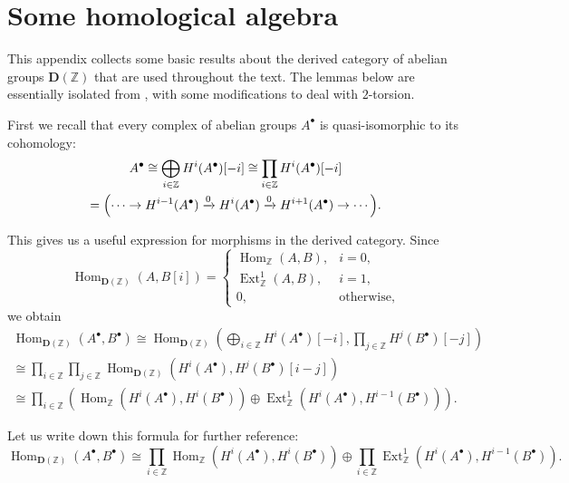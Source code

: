 \documentclass[draft,leqno,12pt]{article}
\theoremstyle{plain}
\theoremstyle{definition}
\DeclareMathOperator{\Hom}{Hom}
\DeclareMathOperator{\Ext}{Ext}
\newcommand{\ZZ}{\mathbb{Z}}
\begin{document}

\pagebreak
\appendix
\section{Some homological algebra}
\label{app:homological-algebra}

This appendix collects some basic results about the derived category of abelian
groups $\mathbf{D} (\ZZ)$ that are used throughout the text. The lemmas below
are essentially isolated from \cite{Flach-Morin-2018}, with some modifications
to deal with $2$-torsion.

First we recall that every complex of abelian groups $A^\bullet$ is
quasi-isomorphic to its cohomology:
\begin{multline*}
  A^\bullet \cong \bigoplus_{i\in \ZZ} H^i (A^\bullet) [-i] \cong
  \prod_{i\in \ZZ} H^i (A^\bullet) [-i] \\
  = \Bigl(\cdots \to H^{i-1} (A^\bullet) \xrightarrow{0} H^i (A^\bullet)
  \xrightarrow{0} H^{i+1} (A^\bullet) \to \cdots\Bigr).
\end{multline*}

This gives us a useful expression for morphisms in the derived category.
Since
\[ \Hom_{\mathbf{D} (\ZZ)} (A,B [i]) = \begin{cases}
\Hom_\ZZ (A,B), & i = 0,\\
\Ext_\ZZ^1 (A,B), & i = 1,\\
0, & \text{otherwise},
\end{cases} \]
we obtain
\begin{multline*}
  \Hom_{\mathbf{D} (\ZZ)} (A^\bullet, B^\bullet) \cong
  \Hom_{\mathbf{D} (\ZZ)} (\bigoplus_{i\in\ZZ} H^i (A^\bullet) [-i], \prod_{j\in\ZZ} H^j (B^\bullet) [-j]) \\
  \cong \prod_{i\in \ZZ} \prod_{j\in \ZZ} \Hom_{\mathbf{D} (\ZZ)} (H^i (A^\bullet), H^j (B^\bullet) [i-j]) \\
  \cong \prod_{i\in \ZZ} \left(\Hom_\ZZ (H^i (A^\bullet), H^i (B^\bullet)) \oplus \Ext_\ZZ^1 (H^i (A^\bullet), H^{i-1} (B^\bullet))\right).
\end{multline*}

Let us write down this formula for further reference:
\begin{equation}
  \label{eqn:morphisms-in-D(Z)}
  \Hom_{\mathbf{D} (\ZZ)} (A^\bullet, B^\bullet) \cong
  \prod_{i\in \ZZ} \Hom_\ZZ (H^i (A^\bullet), H^i (B^\bullet)) \oplus
  \prod_{i\in \ZZ} \Ext_\ZZ^1 (H^i (A^\bullet), H^{i-1} (B^\bullet)).
\end{equation}
\end{document}

